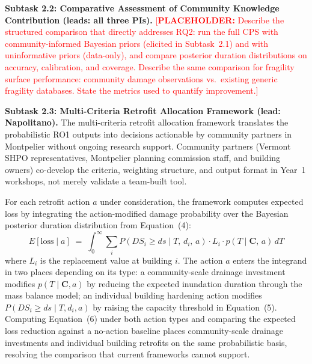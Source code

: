 \documentclass[11pt]{article}
\newcommand{\placeholder}[1]{\textcolor{red}{[\textbf{PLACEHOLDER:} #1]}}
\begin{document}
\textbf{Subtask 2.2: Comparative Assessment of Community Knowledge Contribution (leads: all three PIs).}
\placeholder{Describe the structured comparison that directly addresses RQ2: run the full CPS with community-informed Bayesian priors (elicited in Subtask~2.1) and with uninformative priors (data-only), and compare posterior duration distributions on accuracy, calibration, and coverage.  
Describe the same comparison for fragility surface performance: community damage observations vs.\ existing generic fragility databases.  
State the metrics used to quantify improvement.}

\textbf{Subtask 2.3: Multi-Criteria Retrofit Allocation Framework (lead: Napolitano).}
The multi-criteria retrofit allocation framework translates the probabilistic RO1 outputs into decisions actionable by community partners in Montpelier without ongoing research support.
Community partners (Vermont SHPO representatives, Montpelier planning commission staff, and building owners) co-develop the criteria, weighting structure, and output format in Year~1 workshops, not merely validate a team-built tool.

For each retrofit action $a$ under consideration, the framework computes expected loss by integrating the action-modified damage probability over the Bayesian posterior duration distribution from Equation~(4):
\begin{equation}
  E[\text{loss} \mid a] \;=\; \int_0^\infty \sum_{i} P(DS_i \geq ds \mid T,\, d_i,\, a)\cdot L_i \cdot p(T \mid \mathbf{C},\, a)\, dT
\end{equation}
where $L_i$ is the replacement value at building $i$.
The action $a$ enters the integrand in two places depending on its type: a community-scale drainage investment modifies $p(T \mid \mathbf{C}, a)$ by reducing the expected inundation duration through the mass balance model; an individual building hardening action modifies $P(DS_i \geq ds \mid T, d_i, a)$ by raising the capacity threshold in Equation~(5).
Computing Equation~(6) under both action types and comparing the expected loss reduction against a no-action baseline places community-scale drainage investments and individual building retrofits on the same probabilistic basis, resolving the comparison that current frameworks cannot support.
\end{document}
